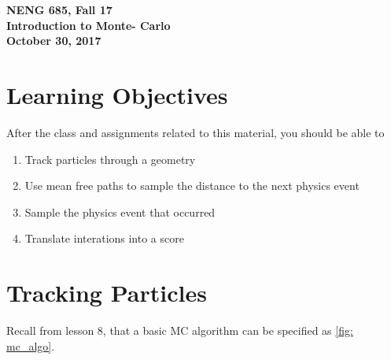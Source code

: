 \documentclass[12pt]{article}
\begin{document}
\begin{center}
{\bf NENG 685, Fall 17 \\
Introduction to Monte- Carlo\\
October 30, 2017}
\end{center}

\section*{Learning Objectives}

After the class and assignments related to this material, you should be able to 
\begin{enumerate}
  \item Track particles through a geometry
  \item Use mean free paths to sample the distance to the next physics event
  \item Sample the physics event that occurred
  \item Translate interations into a score 
\end{enumerate}

\section*{Tracking Particles}

Recall from lesson 8, that a basic MC algorithm can be specified as \autoref{fig: mc_algo}.
\end{document}
